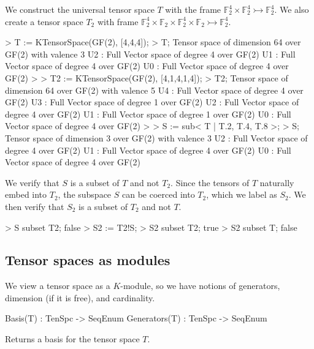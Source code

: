 \begin{example}[TenSpcContainment]

We construct the universal tensor space $T$ with the frame $\mathbb{F}_2^4\times \mathbb{F}_2^4\rightarrowtail \mathbb{F}_2^4$. 
We also create a tensor space $T_2$ with frame $\mathbb{F}_2^4\times \mathbb{F}_2\times \mathbb{F}_2^4\times\mathbb{F}_2\rightarrowtail \mathbb{F}_2^4$.

\begin{code}
> T := KTensorSpace(GF(2), [4,4,4]);
> T;
Tensor space of dimension 64 over GF(2) with valence 3
U2 : Full Vector space of degree 4 over GF(2)
U1 : Full Vector space of degree 4 over GF(2)
U0 : Full Vector space of degree 4 over GF(2)
> 
> T2 := KTensorSpace(GF(2), [4,1,4,1,4]);
> T2;
Tensor space of dimension 64 over GF(2) with valence 5
U4 : Full Vector space of degree 4 over GF(2)
U3 : Full Vector space of degree 1 over GF(2)
U2 : Full Vector space of degree 4 over GF(2)
U1 : Full Vector space of degree 1 over GF(2)
U0 : Full Vector space of degree 4 over GF(2)
> 
> S := sub< T | T.2, T.4, T.8 >;
> S;
Tensor space of dimension 3 over GF(2) with valence 3
U2 : Full Vector space of degree 4 over GF(2)
U1 : Full Vector space of degree 4 over GF(2)
U0 : Full Vector space of degree 4 over GF(2)
\end{code}

We verify that $S$ is a subset of $T$ and not $T_2$. 
Since the tensors of $T$ naturally embed into $T_2$, the subspace $S$ can be coerced into $T_2$, which we label as $S_2$. 
We then verify that $S_2$ is a subset of $T_2$ and not $T$. 
\begin{code}
> S subset T2;
false
> S2 := T2!S;
> S2 subset T2;
true
> S2 subset T;
false
\end{code}
\end{example}

\subsection{Tensor spaces as modules}

We view a tensor space as a $K$-module, so we have notions of generators, 
dimension (if it is free), and cardinality.

\begin{intrinsics}
Basis(T) : TenSpc -> SeqEnum
Generators(T) : TenSpc -> SeqEnum
\end{intrinsics}

Returns a basis for the tensor space $T$. 

